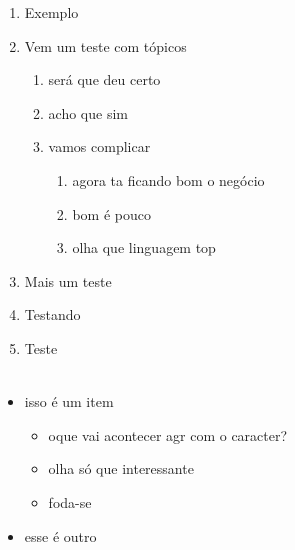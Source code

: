 \documentclass[a4paper, 12pt]{article}
\begin{document}
\begin{enumerate}
    \item Exemplo
    \item Vem um teste com tópicos
    \begin{enumerate}
        \item será que deu certo
        \item acho que sim
        \item vamos complicar   
        \begin{enumerate}
        \item agora ta ficando bom o negócio
        \item bom é pouco
        \item olha que linguagem top 
    \end{enumerate}
    \end{enumerate}
    \item Mais um teste
    \item Testando
    \item Teste
    \\
    \\
\end{enumerate}


\begin{itemize}
    \item isso é um item
    \begin{itemize}
        \item oque vai acontecer agr com o caracter? 
        \item olha só que interessante 
        \item foda-se
    \end{itemize}
    \item esse é outro
    \end{itemize}
    
\end{document}
